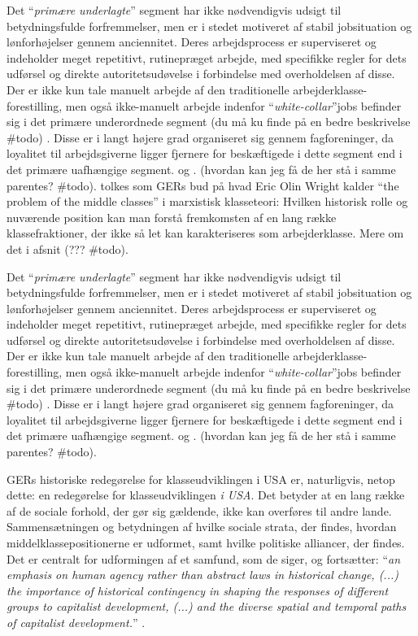 Det “\emph{primære underlagte}” segment har ikke nødvendigvis udsigt til betydningsfulde forfremmelser, men er i stedet motiveret af stabil jobsituation og lønforhøjelser gennem anciennitet. Deres arbejdsprocess er superviseret og indeholder meget repetitivt, rutinepræget arbejde, med specifikke regler for dets udførsel og direkte autoritetsudøvelse i forbindelse med overholdelsen af disse. Der er ikke kun tale manuelt arbejde af den traditionelle arbejderklasse-forestilling, men også ikke-manuelt arbejde indenfor “\emph{white-collar}”jobs befinder sig i det primære underordnede segment (du må ku finde på en bedre beskrivelse \#todo) .  Disse er i langt højere grad organiseret sig gennem fagforeninger, da loyalitet til arbejdsgiverne ligger fjernere for beskæftigede i dette segment end i det primære uafhængige segment. \parencite[28f]{Drago1995} og \parencite[203]{Gordon1982}. (hvordan kan jeg få de her stå i samme parentes? \#todo). tolkes som GERs bud på hvad Eric Olin Wright kalder “the problem of the middle classes” i marxistisk klasseteori: Hvilken historisk rolle og nuværende position kan man forstå fremkomsten af en lang række klassefraktioner, der ikke så let kan karakteriseres som arbejderklasse. Mere om det i afsnit (??? \#todo).

Det “\emph{primære underlagte}” segment har ikke nødvendigvis udsigt til betydningsfulde forfremmelser, men er i stedet motiveret af stabil jobsituation og lønforhøjelser gennem anciennitet. Deres arbejdsprocess er superviseret og indeholder meget repetitivt, rutinepræget arbejde, med specifikke regler for dets udførsel og direkte autoritetsudøvelse i forbindelse med overholdelsen af disse. Der er ikke kun tale manuelt arbejde af den traditionelle arbejderklasse-forestilling, men også ikke-manuelt arbejde indenfor “\emph{white-collar}”jobs befinder sig i det primære underordnede segment (du må ku finde på en bedre beskrivelse \#todo) .  Disse er i langt højere grad organiseret sig gennem fagforeninger, da loyalitet til arbejdsgiverne ligger fjernere for beskæftigede i dette segment end i det primære uafhængige segment. \parencite[28f]{Drago1995} og \parencite[203]{Gordon1982}. (hvordan kan jeg få de her stå i samme parentes? \#todo).

GERs historiske redegørelse for klasseudviklingen i USA er, naturligvis, netop dette: en redegørelse for klasseudviklingen \emph{i USA}. Det betyder at en lang række af de sociale forhold, der gør sig gældende, ikke kan overføres til andre lande. Sammensætningen og betydningen af hvilke sociale strata, der findes, hvordan middelklassepositionerne er udformet, samt hvilke politiske alliancer, der findes. Det er centralt for udformingen af et samfund, som de siger, og fortsætter: “\emph{an emphasis on human agency rather than abstract laws in historical change, (...) the importance of historical contingency in shaping the responses of different groups to capitalist development, (...) and the diverse spatial and temporal paths of capitalist development.}” \parencite[21]{Gordon1982}. 

